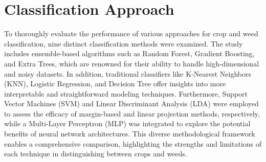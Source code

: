 \documentclass[letterpaper]{report}
\begin{document}
\section{Classification Approach}
%
To thoroughly evaluate the performance of various approaches for crop and weed classification, nine distinct classification methods were examined. The study includes ensemble-based algorithms such as Random Forest, Gradient Boosting, and Extra Trees, which are renowned for their ability to handle high-dimensional and noisy datasets. In addition, traditional classifiers like K-Nearest Neighbors (KNN), Logistic Regression, and Decision Tree offer insights into more interpretable and straightforward modeling techniques. Furthermore, Support Vector Machines (SVM) and Linear Discriminant Analysis (LDA) were employed to assess the efficacy of margin-based and linear projection methods, respectively, while a Multi-Layer Perceptron (\gls{MLP}) was integrated to explore the potential benefits of neural network architectures. This diverse methodological framework enables a comprehensive comparison, highlighting the strengths and limitations of each technique in distinguishing between crops and weeds.
\end{document}
